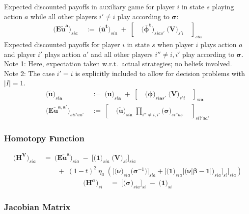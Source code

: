 \documentclass[11pt,fleqn]{article}
\newcommand{\bsigma}{\bm{\sigma}}
\newcommand{\bbeta}{\bm{\beta}}
\newcommand{\bV}{\bm{V}}
\newcommand{\bnu}{\bm{\nu}}
\newcommand{\bone}{\bm{1}}
\newcommand{\ba}{\bm{a}}
\newcommand{\tu}{\tilde{u}}
\begin{document}
Expected discounted payoffs in auxiliary game for player $i$ in state $s$ playing action $a$ while all other players $i'\neq i$ play according to $\bsigma$:
\begin{align*}
	\biggl( \bm{{E\tu^{a}}} \biggr)_{sia} & \;:=\; \biggl( \bm{{\bar{u}^t}} \biggr)_{sia} \;+\; \left[ \quad \biggl( \bm{{\bar{\phi}^t}} \biggr)_{sias'} \; \biggl( \bV \biggr)_{s'i} \quad \right]_{sia}
\end{align*}
Expected discounted payoffs for player $i$ in state $s$ when player $i$ plays action $a$ and player $i'$ plays action $a'$ and all other players $i'' \neq i, i'$ play according to $\bsigma$. \\
Note 1: Here, expectation taken w.r.t.\ actual strategies; no beliefs involved. \\
Note 2: The case $i'=i$ is explicitly included to allow for decision problems with $|I|=1$.
\begin{align*}
	\biggl( \bm{{\tu}} \biggr)_{si\ba} & \;:=\; \biggl( \bm{u} \biggr)_{si\ba} \;+\; \left[ \quad \biggl( \bm{\phi} \biggr)_{si\ba s'} \; \biggl( \bV \biggr)_{s'i} \quad \right]_{si\ba} \\
	\biggl( \bm{{E\tu^{a,a'}}} \biggr)_{sii'aa'} & \;:=\; \left[ \quad \biggl( \bm{{\tu}} \biggr)_{si\ba} \; \prod\limits_{i''\neq i,i'} \biggl( \bsigma \biggr)_{si''a_{i''}} \quad \right]_{sii'aa'}
\end{align*} 


\subsubsection*{Homotopy Function}

\begin{align*}
	\biggl( \bm{H^{V}} \biggr)_{sia} & \;=\; 
		\biggl( \bm{{E\tu^{a}}} \biggr)_{sia} \;-\; \Biggl[ \biggl( \bone \biggr)_{sia} \; \biggl( \bV \biggr)_{si} \Biggr]_{sia} \\
		& \qquad \;+\; (1-t)^2 \: \eta_0 \; \left( \Biggl[ \biggl( \bnu \biggr)_{sia} \biggl( \bsigma^{-1} \biggr) \Biggr]_{sia} + \Biggl[ \biggl( \bone \biggr)_{sia} \Biggl[ \biggl( \bnu\bigl[\bbeta-\bone\bigr] \biggr)_{sia} \Biggr]_{si} \Biggr]_{sia} \right)
\end{align*}
\begin{align*}
	\biggl( \bm{H^{\sigma}} \biggr)_{si} & \;=\; 
		\Biggl[ \biggl( \bsigma \biggr)_{sia} \Biggr]_{si} \;-\; \biggl( \bone \biggr)_{si} 
\end{align*}


\subsubsection*{Jacobian Matrix} 
\end{document}
